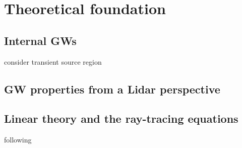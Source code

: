 \section{Theoretical foundation}

\subsection{Internal GWs}

 consider transient source region
 
 
\subsection{GW properties from a Lidar perspective}

\cite{dornbrack_interpretation_2017}

\subsection{Linear theory and the ray-tracing equations}

following \cite{marks_eckerman}

